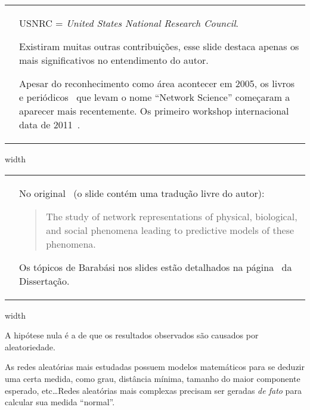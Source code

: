 \documentclass[10pt,a4paper,final]{article}
\newcommand\disappearingrule{%
  \par %
  \vskip10pt %
  \leaders\vrule width \textwidth\vskip0.4pt %
  \nointerlineskip %
  \vskip10pt %
}
\begin{document}
\begin{tabular}{p{.45\linewidth} P{.45\linewidth}}
  \vspace{0pt}
  &
  \vspace{2pt}
  USNRC = \textit{United States National Research Council}.
  
  Existiram muitas outras contribuições, esse slide destaca apenas os mais significativos no entendimento do autor.
  
  Apesar do reconhecimento como área acontecer em 2005, os livros~\cite{Barabasi2016-rn} e periódicos~\cite{Facebookcomspringeropn2016-wf} que levam o nome \enquote{Network Science} começaram a aparecer mais recentemente. Os primeiro workshop internacional data de 2011~\cite{Ieee2011-ti}.
\end{tabular}

\disappearingrule

\begin{tabular}{p{.5\linewidth} P{.48\linewidth}}
  \vspace{0pt}
  &
  \vspace{2pt}
  No original~\cite{National_Research_Council2006-lv} (o slide contém uma tradução livre do autor):
  \begin{quote}
    The study of network representations of physical, biological, and social phenomena leading to predictive models of these phenomena.
  \end{quote}

  Os tópicos de Barabási nos slides estão detalhados na página~\pageref{desc:ciencia-de-redes} da Dissertação.
\end{tabular}

\disappearingrule

\begin{minipage}[t][18\baselineskip]{\linewidth}
  \begin{wrapfigure}{l}{0.5\textwidth}
  \end{wrapfigure}
  
  A hipótese nula é a de que os resultados observados são causados por aleatoriedade.
  
  As redes aleatórias mais estudadas possuem modelos matemáticos para se deduzir uma certa medida, como grau, distância mínima, tamanho do maior componente esperado, etc\ldots Redes aleatórias mais complexas precisam ser geradas \textit{de fato} para calcular sua medida \enquote{normal}.
\end{minipage}
\end{document}
